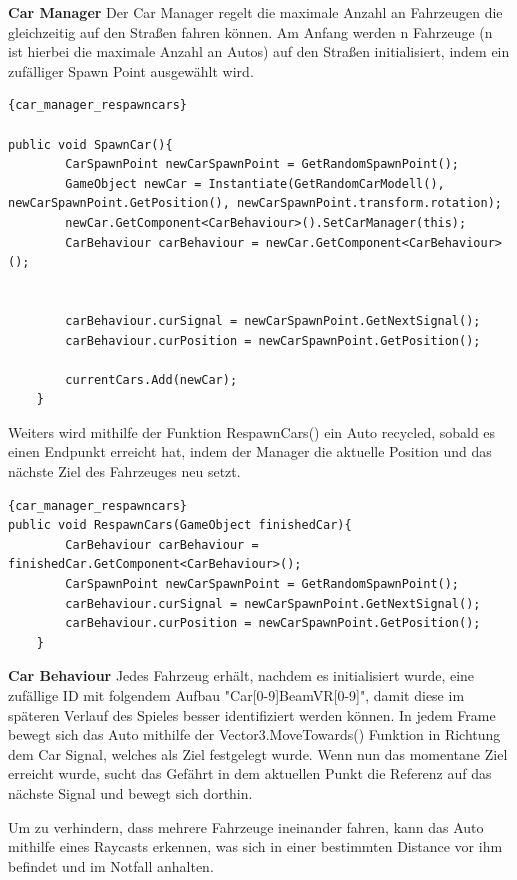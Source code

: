 \textbf{Car Manager}
Der Car Manager regelt die maximale Anzahl an Fahrzeugen die gleichzeitig auf den Straßen fahren k\"onnen.
Am Anfang werden n Fahrzeuge (n ist hierbei die maximale Anzahl an Autos) auf den Straßen initialisiert, indem ein zuf\"alliger Spawn Point ausgewählt wird.
\begin{lstlisting}{car_manager_respawncars}

public void SpawnCar(){
        CarSpawnPoint newCarSpawnPoint = GetRandomSpawnPoint();
        GameObject newCar = Instantiate(GetRandomCarModell(), newCarSpawnPoint.GetPosition(), newCarSpawnPoint.transform.rotation);
        newCar.GetComponent<CarBehaviour>().SetCarManager(this);
        CarBehaviour carBehaviour = newCar.GetComponent<CarBehaviour>();


        carBehaviour.curSignal = newCarSpawnPoint.GetNextSignal();
        carBehaviour.curPosition = newCarSpawnPoint.GetPosition();

        currentCars.Add(newCar);
    }
\end{lstlisting}

Weiters wird mithilfe der Funktion RespawnCars() ein Auto recycled, sobald es einen Endpunkt erreicht hat, indem der Manager die aktuelle Position und das n\"achste Ziel des Fahrzeuges neu setzt.
\begin{lstlisting}{car_manager_respawncars}
public void RespawnCars(GameObject finishedCar){
        CarBehaviour carBehaviour = finishedCar.GetComponent<CarBehaviour>();
        CarSpawnPoint newCarSpawnPoint = GetRandomSpawnPoint();
        carBehaviour.curSignal = newCarSpawnPoint.GetNextSignal();
        carBehaviour.curPosition = newCarSpawnPoint.GetPosition();
    }
\end{lstlisting}

\textbf{Car Behaviour}
Jedes Fahrzeug erh\"alt, nachdem es initialisiert wurde, eine zufällige ID mit folgendem Aufbau "Car[0-9]BeamVR[0-9]", damit diese im sp\"ateren Verlauf des Spieles besser identifiziert werden können.
In jedem Frame bewegt sich das Auto mithilfe der Vector3.MoveTowards() Funktion in Richtung dem Car Signal, welches als Ziel festgelegt wurde.
Wenn nun das momentane Ziel erreicht wurde, sucht das Gefährt in dem aktuellen Punkt die Referenz auf das nächste Signal und bewegt sich dorthin.

Um zu verhindern, dass mehrere Fahrzeuge ineinander fahren, kann das Auto mithilfe eines Raycasts erkennen, was sich in einer bestimmten Distance vor ihm befindet und im Notfall anhalten.

